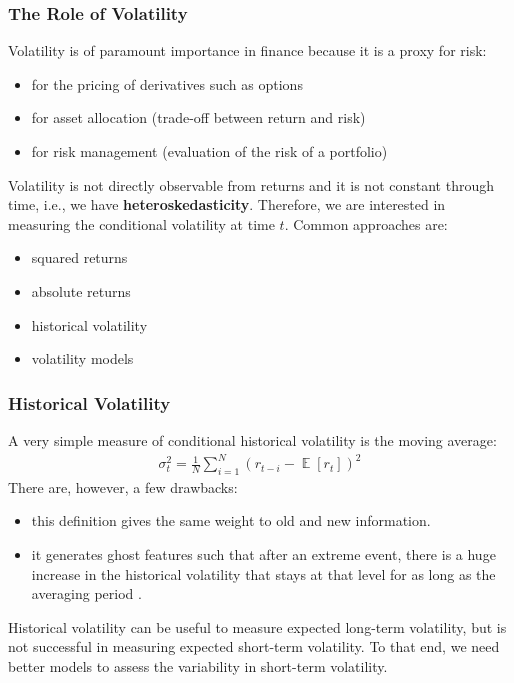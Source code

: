 \documentclass[xcolor=dvipsnames, english, 8pt]{beamer}
\DeclareMathOperator{\E}{\mathbb{E}}
\begin{document}
\begin{frame}
    \frametitle{The Role of Volatility}
Volatility is of paramount importance in finance because it is a {\color{ubRed}proxy for risk}:\vspace{0.25cm}\\
\begin{itemize}
    \item for the {\color{ubRed}pricing of derivatives} such as options
    \item for {\color{ubRed}asset allocation} (trade-off between return and risk)
    \item for {\color{ubRed}risk management} (evaluation of the risk of a portfolio)\vspace{0.5cm}\\
\end{itemize}
Volatility is {\color{ubRed}not directly observable} from returns and it is not constant through time, i.e., we have {\color{ubRed}\textbf{heteroskedasticity}}.
Therefore, we are interested in measuring the {\color{ubRed}conditional volatility} at time $t$. Common approaches are:\vspace{0.25cm}\\
\begin{itemize}
    \item squared returns
    \item absolute returns
    \item  {\color{ubRed} historical volatility}
    \item  {\color{ubRed} volatility models}
\end{itemize}
\end{frame}

\begin{frame}
    \frametitle{Historical Volatility}
A very simple measure of conditional historical volatility is the moving average:
\begin{align}
    \sigma_t^2 = \frac{1}{N} \sum\limits_{i=1}^N(r_{t-i} - \E[r_{t}])^2
\end{align}
There are, however, a few drawbacks:\vspace{0.25cm}\\
\begin{itemize}
    \item this definition gives the same weight to old and new information.
    \item it generates ghost features such that after an extreme event, there is a huge increase in the historical volatility that stays at that level for as long as the averaging period .\vspace{0.25cm}\\
\end{itemize}
Historical volatility can be useful to measure {\color{ubRed}expected long-term volatility}, but is {\color{ubRed}not successful
in measuring expected short-term volatility}. To that end, we need better models to assess the {\color{ubRed}variability in short-term volatility}.
\end{frame}
\end{document}
